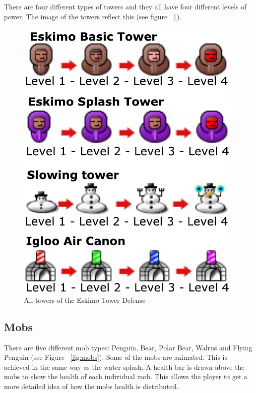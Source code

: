 There are four different types of towers and they all have four different levels of power. The image of the towers reflect this (see figure ~\ref{fig:allTowers}).
\clearpage
\begin{figure}[here]

\begin{center}

\includegraphics[scale=0.6]{pics/chapters/chapter4/alltowers}

\end{center}

\caption{All towers of the Eskimo Tower Defense}

\label{fig:allTowers}

\end{figure}

\subsection{Mobs}

There are five different mob types: Penguin, Bear, Polar Bear, Walrus and Flying Penguin (see Figure ~\ref{fig:mobs}). Some of the mobs are animated. This is achieved in the same way as the water splash. A health bar is drawn above the mobs to show the health of each individual mob. This allows the player to get a more detailed idea of how the mobs health is distributed. 

